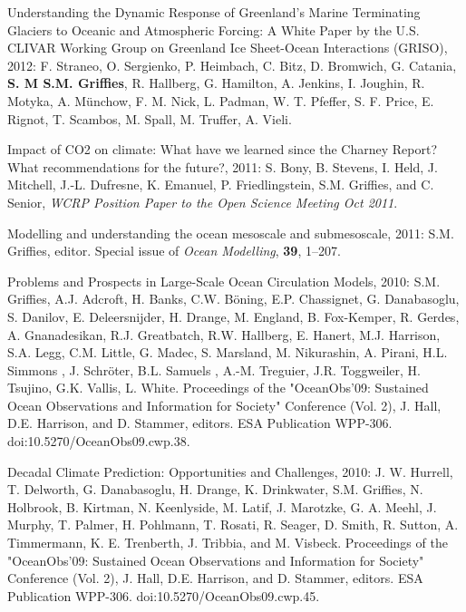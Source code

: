 \begin{etaremune}
\item Understanding the Dynamic Response of Greenland’s Marine
  Terminating Glaciers to Oceanic and Atmospheric Forcing: A White
  Paper by the U.S. CLIVAR Working Group on Greenland Ice Sheet-Ocean
  Interactions (GRISO), 2012: F. Straneo, O. Sergienko, P. Heimbach,
  C. Bitz, D. Bromwich, G. Catania, {\bf S. M S.M. Grif\/f\/ies}, R.
  Hallberg, G. Hamilton, A. Jenkins, I. Joughin, R. Motyka,
  A. Münchow, F. M. Nick, L. Padman, W. T. Pfeffer, S. F. Price,
  E. Rignot, T. Scambos, M. Spall, M. Truffer, A. Vieli.

\item Impact of CO2 on climate: What have we learned since the Charney
  Report?  What recommendations for the future?, 2011: S. Bony,
  B. Stevens, I. Held, J. Mitchell, J.-L. Dufresne, K. Emanuel,
  P. Friedlingstein, S.M. Grif\/f\/ies, and C. Senior, {\it WCRP
    Position Paper to the Open Science Meeting Oct 2011}.

\item Modelling and understanding the ocean mesoscale and
  submesoscale, 2011: S.M. Grif\/f\/ies, editor. Special issue of
  {\it Ocean Modelling}, {\bf 39}, 1--207.

\item Problems and Prospects in Large-Scale Ocean Circulation Models,
  2010: S.M. Grif\/f\/ies, A.J. Adcroft, H. Banks, C.W. B\"oning,
 E.P. Chassignet, G. Danabasoglu, S.  Danilov, E. Deleersnijder,
  H. Drange, M. England, B. Fox-Kemper, R. Gerdes, A.  Gnanadesikan,
  R.J. Greatbatch, R.W. Hallberg, E. Hanert, M.J. Harrison, S.A. Legg,
  C.M.  Little, G. Madec, S. Marsland, M. Nikurashin, A. Pirani,
  H.L. Simmons , J. Schr\"oter, B.L.  Samuels , A.-M. Treguier,
  J.R. Toggweiler, H. Tsujino, G.K. Vallis, L. White.  Proceedings of
  the "OceanObs’09: Sustained Ocean Observations and Information for
  Society" Conference (Vol. 2), J. Hall, D.E. Harrison, and
  D. Stammer, editors. ESA Publication WPP-306.
  doi:10.5270/OceanObs09.cwp.38.

\item Decadal Climate Prediction: Opportunities and Challenges, 2010:
  J. W. Hurrell, T. Delworth, G. Danabasoglu, H. Drange,
  K. Drinkwater, S.M. Grif\/f\/ies, N. Holbrook, B. Kirtman,
  N. Keenlyside, M. Latif, J. Marotzke, G. A. Meehl, J. Murphy,
  T. Palmer, H. Pohlmann, T. Rosati, R. Seager, D. Smith, R. Sutton,
  A. Timmermann, K. E. Trenberth, J. Tribbia, and M. Visbeck.
  Proceedings of the "OceanObs’09: Sustained Ocean Observations and
  Information for Society" Conference (Vol. 2), J. Hall,
  D.E. Harrison, and D. Stammer, editors. ESA Publication WPP-306.
  doi:10.5270/OceanObs09.cwp.45.


\end{etaremune}
